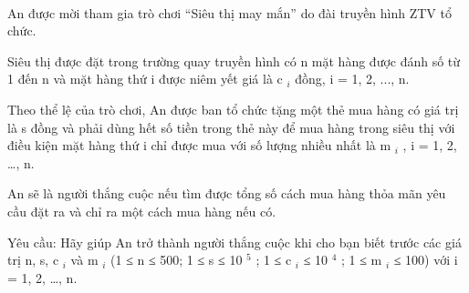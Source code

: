  

An được mời tham gia trò chơi “Siêu thị may mắn” do đài truyền hình ZTV tổ chức.

Siêu thị được đặt trong trường quay truyền hình có n mặt hàng được đánh số từ 1 đến n và mặt hàng thứ i được niêm yết giá là c $_ i $ đồng, i = 1, 2, ..., n.

Theo thể lệ của trò chơi, An được ban tổ chức tặng một thẻ mua hàng có giá trị là s đồng và phải dùng hết số tiền trong thẻ này để mua hàng trong siêu thị với điều kiện mặt hàng thứ i chỉ được mua với số lượng nhiều nhất là m $_ i $ , i = 1, 2, …, n.

An sẽ là người thắng cuộc nếu tìm được tổng số cách mua hàng thỏa mãn yêu cầu đặt ra và chỉ ra một cách mua hàng nếu có.

Yêu cầu: Hãy giúp An trở thành người thắng cuộc khi cho bạn biết trước các giá trị n, s, c $_ i $ và m $_ i $ (1 ≤ n ≤ 500; 1 ≤ s ≤ 10 $^ 5 $ ; 1 ≤ c $_ i $ ≤ 10 $^ 4 $ ; 1 ≤ m $_ i $ ≤ 100) với i = 1, 2, …, n.